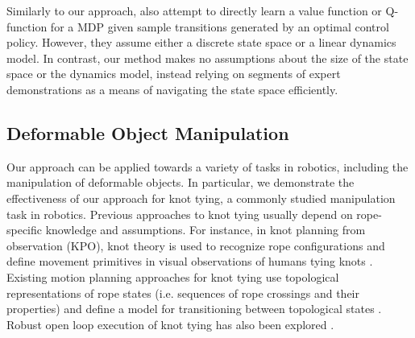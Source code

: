 Similarly to our approach, \citet{Dvijotham_ICML2010} also attempt to directly
learn a value function or Q-function for a MDP given sample transitions
generated by an optimal control policy. However, they assume either a discrete
state space or a linear dynamics model. In contrast, our method makes no
assumptions about the size of the state space or the dynamics model, instead
relying on segments of expert demonstrations as a means of navigating the state
space efficiently. 

\subsection{Deformable Object Manipulation}
Our approach can be applied towards a variety of tasks in robotics,
including the manipulation of deformable objects.
In particular, we demonstrate the effectiveness of our approach for
knot tying, a commonly studied manipulation task in robotics.
Previous approaches to knot tying usually depend on rope-specific knowledge
and assumptions.
For instance, in knot planning from observation (KPO), knot theory is used
to recognize rope configurations and define movement primitives in visual
observations of humans tying knots \cite{Morita_ICRA2003, Takamatsu_TransRob2006}.
Existing motion planning approaches for knot tying use topological
representations of rope states (i.e. sequences of rope crossings and their
properties) and define a model for transitioning between topological states
\cite{Saha_ExpRobotics2008, Wakamatsu_IJRR2006}.
Robust open loop execution of knot tying has also been explored \cite{Bell_PhD2010}.


